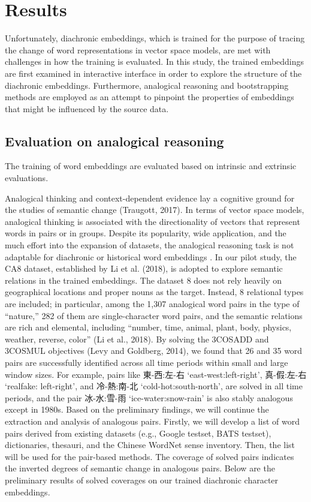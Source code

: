 

\chapter{Results}

Unfortunately, diachronic embeddings, which is trained for the purpose of tracing the change of word representations in vector space models, are met with challenges in how the training is evaluated. In this study, the trained embeddings are first examined in interactive interface in order to explore the structure of the diachronic embeddings. Furthermore, analogical reasoning and bootstrapping methods are employed as an attempt to pinpoint the properties of embeddings that might be influenced by the source data.

\section{Evaluation on analogical reasoning}

The training of word embeddings are evaluated based on intrinsic and extrinsic evaluations.  

Analogical thinking and context-dependent evidence lay a cognitive ground for the studies of semantic change (Traugott, 2017). In terms of vector space models, analogical thinking is associated with the directionality of vectors that represent words in pairs or in groups. Despite its popularity, wide application, and the much effort into the expansion of datasets, the analogical reasoning task is not adaptable for diachronic or historical word embeddings \parencite{wevers2020digital}. In our pilot study, the CA8 dataset, established by Li et al. (2018), is adopted to explore semantic relations in the trained embeddings. The dataset 8 does not rely heavily on geographical locations and proper nouns as the target. Instead, 8 relational types are included; in particular, among the 1,307 analogical word pairs in the type of “nature,” 282 of them are single-character word pairs, and the semantic relations are rich and elemental, including “number, time, animal, plant, body, physics, weather, reverse, color” (Li et al., 2018). By solving the 3COSADD and 3COSMUL objectives (Levy and Goldberg, 2014), we found that 26 and 35 word pairs are successfully identified across all time periods within small and large window sizes. For example, pairs like 東-西:左-右 ‘east-west:left-right’, 真-假:左-右 ‘realfake: left-right’, and 冷-熱:南-北 ‘cold-hot:south-north’, are solved in all time periods, and the pair 冰-水:雪-雨 ‘ice-water:snow-rain’ is also stably analogous except in 1980s. Based on the preliminary findings, we will continue the extraction and analysis of analogous pairs. Firstly, we will develop a list of word pairs derived from existing datasets (e.g., Google testset, BATS testset), dictionaries, thesauri, and the Chinese WordNet sense inventory. Then, the list will be used for the pair-based methods. The coverage of solved pairs indicates the inverted degrees of semantic change in analogous pairs. Below are the preliminary results of solved coverages on our trained diachronic character embeddings.

